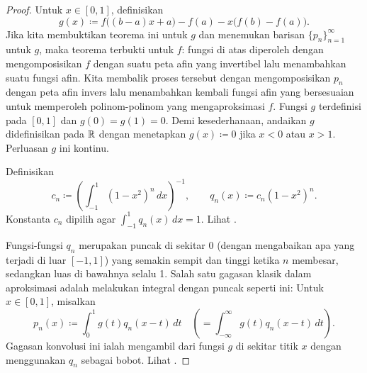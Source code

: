 \begin{proof}
Untuk $x \in [0,1]$,
definisikan
\begin{equation*}
g(x) \coloneqq f\bigl((b-a)x+a\bigr)-f(a) - x\bigl(f(b)-f(a)\bigr) .
\end{equation*}
Jika kita membuktikan teorema ini untuk $g$ dan menemukan barisan
$\{ p_n \}_{n=1}^\infty$ untuk $g$,
maka teorema terbukti untuk $f$: fungsi di atas diperoleh dengan
mengomposisikan $f$ dengan suatu peta afin yang invertibel lalu menambahkan
suatu fungsi afin.  Kita membalik proses tersebut dengan mengomposisikan $p_n$
dengan peta afin invers lalu menambahkan kembali fungsi afin yang bersesuaian
untuk memperoleh polinom-polinom yang mengaproksimasi $f$.
Fungsi $g$ terdefinisi pada $[0,1]$ dan $g(0)=g(1)=0$.
Demi kesederhanaan, andaikan
$g$ didefinisikan pada ${\mathbb{R}}$ dengan menetapkan
$g(x) \coloneqq 0$ jika $x < 0$ atau $x > 1$.  Perluasan $g$ ini kontinu.

Definisikan
\begin{equation*}
c_n \coloneqq {\left( \int_{-1}^1 {(1-x^2)}^n\,dx \right)}^{-1} ,
\qquad
q_n(x) \coloneqq c_n (1-x^2)^n .
\end{equation*}
Konstanta $c_n$ dipilih
agar $\int_{-1}^1 q_n(x)\,dx = 1$.
Lihat .

\begin{myfigureht}
\caption{Grafik fungsi-fungsi delta hampiran $q_n$ pada $[-1,1]$ untuk
$n=5,10,15,20,\ldots,100$; nilai $n$ yang lebih besar ditampilkan dalam nuansa
yang lebih terang.\label{fig:weierqn}}
\end{myfigureht}

Fungsi-fungsi $q_n$ merupakan puncak di sekitar 0 (dengan mengabaikan apa yang
terjadi di luar $[-1,1]$) yang semakin sempit dan tinggi ketika $n$ membesar,
sedangkan luas di bawahnya selalu 1.
Salah satu gagasan klasik dalam aproksimasi
adalah melakukan integral \emph{} dengan puncak seperti ini:
Untuk $x \in [0,1]$, misalkan
\begin{equation*}
p_n(x) \coloneqq \int_{0}^1 g(t)q_n(x-t) \,dt \quad \left( = \int_{-\infty}^\infty
g(t)q_n(x-t) \,dt \right) .
\end{equation*}
Gagasan konvolusi ini ialah mengambil  dari fungsi
$g$ di sekitar titik $x$ dengan menggunakan $q_n$ sebagai bobot.
Lihat .


\end{proof}
